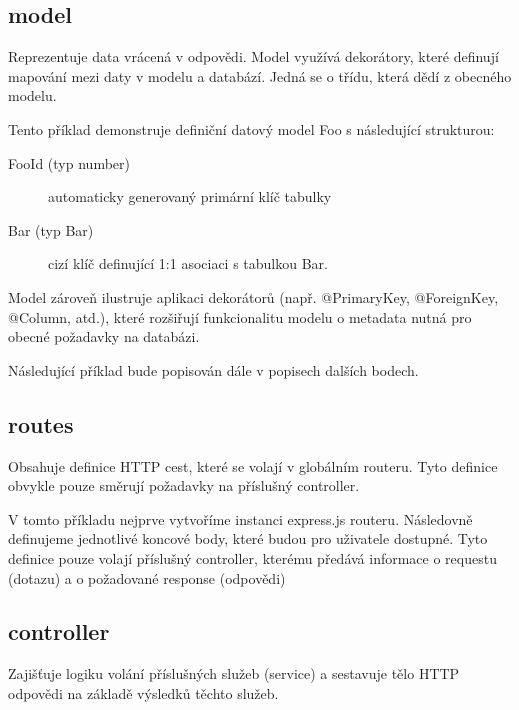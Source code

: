 \subsection{model}
Reprezentuje data vrácená v odpovědi. Model využívá dekorátory, které definují mapování mezi daty v modelu a databází. Jedná se o třídu, která dědí z obecného modelu.



Tento příklad demonstruje definiční datový model Foo s následující strukturou:
\begin{description}
    \item[FooId (typ number)] automaticky generovaný primární klíč tabulky
    \item[Bar (typ Bar)] cizí klíč definující 1:1 asociaci s tabulkou Bar.
\end{description} 

Model zároveň ilustruje aplikaci dekorátorů (např. @PrimaryKey, @ForeignKey, @Column, atd.), které rozšiřují funkcionalitu modelu o metadata nutná pro obecné požadavky na databázi. 

Následující příklad bude popisován dále v popisech dalších bodech.
\subsection{routes}
Obsahuje definice HTTP cest, které se volají v globálním routeru. Tyto definice obvykle pouze směrují požadavky na příslušný controller.



V tomto příkladu nejprve vytvoříme instanci express.js routeru. Následovně definujeme jednotlivé koncové body, které budou pro uživatele dostupné. Tyto definice pouze volají příslušný controller, kterému předává informace o requestu (dotazu) a o požadované response (odpovědi)

\subsection{controller} 
Zajišťuje logiku volání příslušných služeb (service) a sestavuje tělo HTTP odpovědi na základě výsledků těchto služeb.



